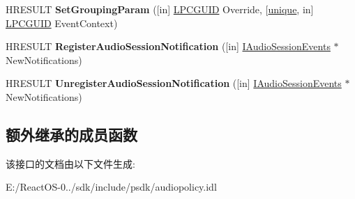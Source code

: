 \begin{DoxyCompactItemize}
H\+R\+E\+S\+U\+LT {\bfseries Set\+Grouping\+Param} (\mbox{[}in\mbox{]} \hyperlink{interface_g_u_i_d}{L\+P\+C\+G\+U\+ID} Override, \mbox{[}\hyperlink{interfaceunique}{unique}, in\mbox{]} \hyperlink{interface_g_u_i_d}{L\+P\+C\+G\+U\+ID} Event\+Context)
\item 
\mbox{\label{interface_i_audio_session_control_a3d69fc41288e9e290d461d5be8f5cc01}} 
H\+R\+E\+S\+U\+LT {\bfseries Register\+Audio\+Session\+Notification} (\mbox{[}in\mbox{]} \hyperlink{interface_i_audio_session_events}{I\+Audio\+Session\+Events} $\ast$New\+Notifications)
\item 
\mbox{\label{interface_i_audio_session_control_aad87af75e02736508e06a04115fcfce5}} 
H\+R\+E\+S\+U\+LT {\bfseries Unregister\+Audio\+Session\+Notification} (\mbox{[}in\mbox{]} \hyperlink{interface_i_audio_session_events}{I\+Audio\+Session\+Events} $\ast$New\+Notifications)
\end{DoxyCompactItemize}
\subsection*{额外继承的成员函数}


该接口的文档由以下文件生成\+:\begin{DoxyCompactItemize}
\item 
E\+:/\+React\+O\+S-\/0../sdk/include/psdk/audiopolicy.\+idl\end{DoxyCompactItemize}
